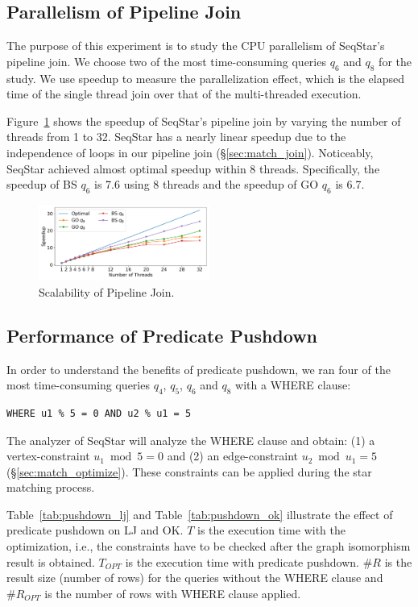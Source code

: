\subsection{Parallelism of Pipeline Join}\label{sec:experiments_join}
The purpose of this experiment is to study the CPU parallelism of SeqStar's pipeline join.
We choose two of the most time-consuming queries $q_6$ and $q_8$ for the study.
We use speedup to measure the parallelization effect,
which is the elapsed time of the single thread join over that of the multi-threaded execution.

Figure~\ref{img:exp_scalability} shows the speedup of SeqStar's pipeline join by varying the number of threads from 1 to 32.
SeqStar has a nearly linear speedup due to the independence of loops in our pipeline join (\S\ref{sec:match_join}).
Noticeably, SeqStar achieved almost optimal speedup within 8 threads.
Specifically, the speedup of BS $q_6$ is 7.6 using 8 threads and the speedup of GO $q_6$ is 6.7.
\begin{figure}[ht]
  \centering
  \includegraphics[width=0.5\textwidth]{img/exp_scalability.pdf}
  \caption{Scalability of Pipeline Join.}\label{img:exp_scalability}
\end{figure}

\subsection{Performance of Predicate Pushdown}
In order to understand the benefits of predicate pushdown,
we ran four of the most time-consuming queries $q_4$, $q_5$, $q_6$ and $q_8$ with a WHERE clause:
\begin{Verbatim}[fontsize=\small]
  WHERE u1 % 5 = 0 AND u2 % u1 = 5
\end{Verbatim}
The analyzer of SeqStar will analyze the WHERE clause and obtain:
(1) a vertex-constraint $u_1 \bmod 5 = 0$ and (2) an edge-constraint $u_2 \bmod u_1 = 5$ (\S\ref{sec:match_optimize}).
These constraints can be applied during the star matching process.

Table~\ref{tab:pushdown_lj} and Table~\ref{tab:pushdown_ok} illustrate the effect of predicate pushdown on LJ and OK\@.
$T$ is the execution time with the optimization, i.e., the constraints have to be checked after the graph isomorphism result is obtained.
$T_{OPT}$ is the execution time with predicate pushdown.
$\#R$ is the result size (number of rows) for the queries without the WHERE clause and $\#R_{OPT}$ is the number of rows with WHERE clause applied.

